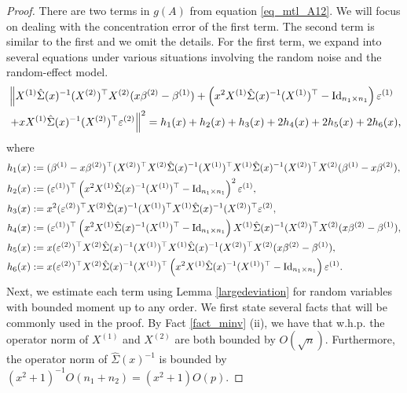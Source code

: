 \begin{proof}
 There are two terms in $g(A)$ from equation \eqref{eq_mtl_A12}.
 We will focus on dealing with the concentration error of the first term. The second term is similar to the first and we omit the details.
 For the first term, we expand into several equations under various situations involving the random noise and the random-effect model.
 \begin{align}
 & \left\| X^{(1)} \hat\Sigma(x)^{-1} (X^{(2)})^\top X^{(2)} (x\beta^{(2)}-\beta^{(1)})+ \left(x^2 X^{(1)}\hat \Sigma(x)^{-1} (X^{(1)})^\top-\operatorname{Id}_{n_1\times n_1}\right)\varepsilon^{(1)} \right. \nonumber\\
		& \left. + x X^{(1)}\hat \Sigma(x)^{-1} (X^{(2)})^\top \varepsilon^{(2)} \right\|^2=h_1(x) + h_2(x) +h_3(x) + 2h_4(x) + 2h_5(x) + 2h_6(x), \label{expand_6}
 \end{align}
 where
 \begin{align*}
&h_1(x):=  (\beta^{(1)}-x\beta^{(2)})^\top (X^{(2)})^\top X^{(2)}  \hat\Sigma(x)^{-1}  (X^{(1)})^\top X^{(1)} \hat\Sigma(x)^{-1} (X^{(2)})^\top X^{(2)} (\beta^{(1)}-x\beta^{(2)})  ,\\
& h_2(x) := {(\varepsilon^{(1)})^\top \left(x^2 X^{(1)}\hat\Sigma(x)^{-1} (X^{(1)})^\top-\operatorname{Id}_{n_1\times n_1}\right)^2\varepsilon^{(1)}}  ,\\
& h_3(x):=  x^2 { (\varepsilon^{(2)} )^\top X^{(2)} \hat\Sigma(x)^{-1}  (X^{(1)})^\top X^{(1)}\hat\Sigma(x)^{-1} (X^{(2)})^\top \varepsilon^{(2)}} , \\
& h_4(x):=  (\varepsilon^{(1)})^\top\left(x^2 X^{(1)}\hat\Sigma(x)^{-1} (X^{(1)})^\top-\operatorname{Id}_{n_1\times n_1}\right) X^{(1)} \hat\Sigma(x)^{-1} (X^{(2)})^\top X^{(2)} (x\beta^{(2)}-\beta^{(1)}), \\
&h_5(x):=x (\varepsilon^{(2)})^\top X^{(2)}\hat\Sigma(x)^{-1} (X^{(1)})^\top X^{(1)} \hat\Sigma(x)^{-1} (X^{(2)})^\top X^{(2)} (x\beta^{(2)}-\beta^{(1)}),\\
&h_6(x):=x (\varepsilon^{(2)})^\top X^{(2)}\hat\Sigma(x)^{-1} (X^{(1)})^\top\left(x^2 X^{(1)}\hat\Sigma(x)^{-1} (X^{(1)})^\top-\operatorname{Id}_{n_1\times n_1}\right)\varepsilon^{(1)}.
\end{align*}
Next, we estimate each term using Lemma \ref{largedeviation} for random variables with bounded moment up to any order.
We first state several facts that will be commonly used in the proof.
By Fact \ref{fact_minv} (ii), we have that w.h.p. the operator norm of $X^{(1)}$ and $X^{(2)}$ are both bounded by $O(\sqrt{n})$.
Furthermore, the operator norm of $\hat\Sigma(x)^{-1}$ is bounded by $(x^2 + 1)^{-1} O(n_1 + n_2) = (x^2 + 1) O(p)$.


\end{proof}
